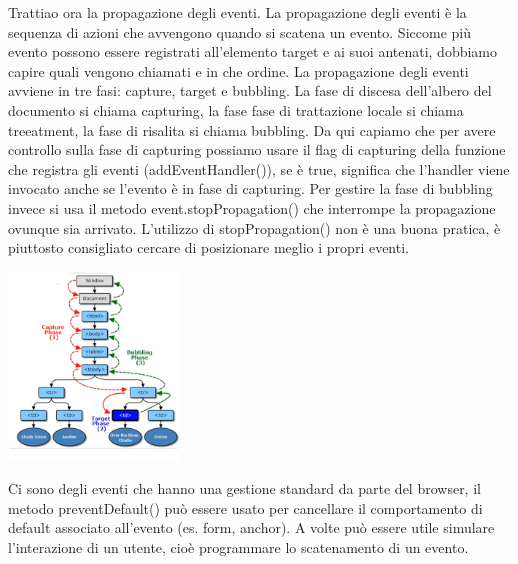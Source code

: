\newline
Trattiao ora la propagazione degli eventi.\newline
La propagazione degli eventi è la sequenza di azioni che avvengono quando si scatena un evento. Siccome più evento possono essere registrati all'elemento target e ai suoi antenati, dobbiamo capire quali vengono chiamati e in che ordine.\newline
La propagazione degli eventi avviene in tre fasi: capture, target e bubbling.\newline
La fase di discesa dell'albero del documento si chiama capturing, la fase fase di trattazione locale si chiama treeatment, la fase di risalita si chiama bubbling.\newline
Da qui capiamo che per avere controllo sulla fase di capturing possiamo usare il flag di capturing della funzione che registra gli eventi (addEventHandler()), se è true, significa che l'handler viene invocato anche se l'evento è in fase di capturing.\newline
Per gestire la fase di bubbling invece si usa il metodo event.stopPropagation() che interrompe la propagazione ovunque sia arrivato. L'utilizzo di stopPropagation() non è una buona pratica, è piuttosto consigliato cercare di posizionare meglio i propri eventi.
\begin{center}
    \includegraphics[height=5cm]{../lezione17/img1.PNG}
\end{center}
Ci sono degli eventi che hanno una gestione standard da parte del browser, il metodo preventDefault() può essere usato per cancellare il comportamento di default associato all'evento (es. form, anchor).\newline
A volte può essere utile simulare l'interazione di un utente, cioè programmare lo scatenamento di un evento.\newline
\newline